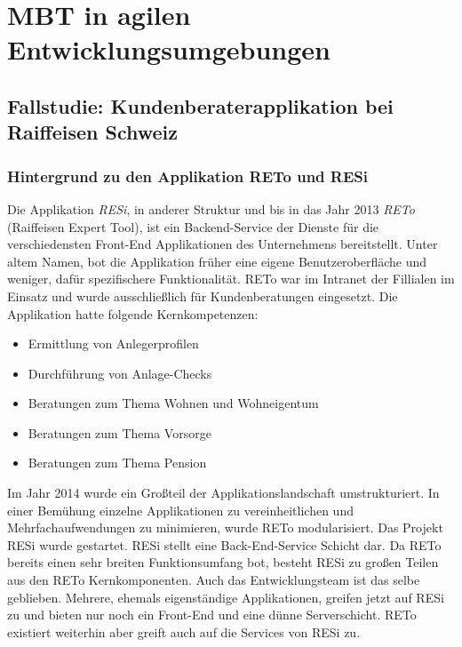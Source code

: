 \chapter{MBT in agilen Entwicklungsumgebungen}
\label{sec:problemdescription}

\section{Fallstudie: Kundenberaterapplikation bei Raiffeisen Schweiz}

\subsection{Hintergrund zu den Applikation RETo und RESi}
Die Applikation \textit{RESi}, in anderer Struktur und bis in das Jahr 2013 \textit{RETo} (Raiffeisen Expert Tool), ist ein Backend-Service der Dienste für die verschiedensten Front-End Applikationen des Unternehmens bereitstellt. Unter altem Namen, bot die Applikation früher eine eigene Benutzeroberfläche und weniger, dafür spezifischere Funktionalität. RETo war im Intranet der Fillialen im Einsatz und wurde ausschließlich für Kundenberatungen eingesetzt. Die Applikation hatte folgende Kernkompetenzen:

\begin{itemize}
\item Ermittlung von Anlegerprofilen
\item Durchführung von Anlage-Checks
\item Beratungen zum Thema Wohnen und Wohneigentum
\item Beratungen zum Thema Vorsorge
\item Beratungen zum Thema Pension
\end{itemize}

Im Jahr 2014 wurde ein Großteil der Applikationslandschaft umstrukturiert. In einer Bemühung einzelne Applikationen zu vereinheitlichen und Mehrfachaufwendungen zu minimieren, wurde RETo modularisiert. Das Projekt RESi wurde gestartet. RESi stellt eine Back-End-Service Schicht dar. Da RETo bereits einen sehr breiten Funktionsumfang bot, besteht RESi zu großen Teilen aus den RETo Kernkomponenten. Auch das Entwicklungsteam ist das selbe geblieben. Mehrere, ehemals eigenständige Applikationen, greifen jetzt auf RESi zu und bieten nur noch ein Front-End und eine dünne Serverschicht. RETo existiert weiterhin aber greift auch auf die Services von RESi zu.

